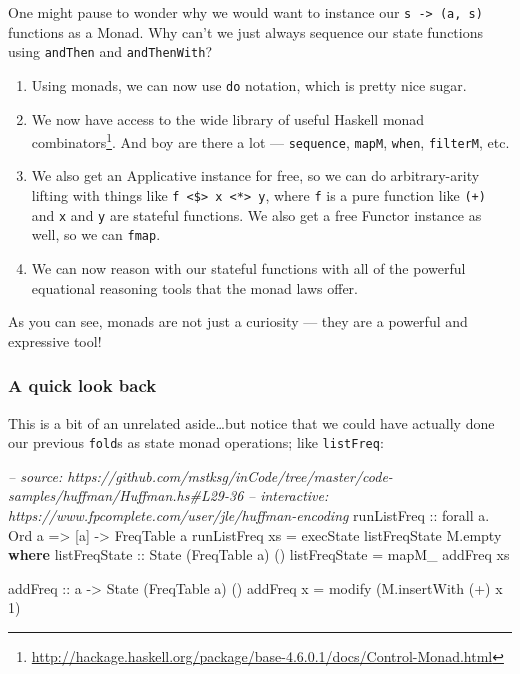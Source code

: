 \documentclass[]{article}
\newenvironment{Shaded}{}{}
\newcommand{\KeywordTok}[1]{\textcolor[rgb]{0.00,0.44,0.13}{\textbf{{#1}}}}
\newcommand{\DataTypeTok}[1]{\textcolor[rgb]{0.56,0.13,0.00}{{#1}}}
\newcommand{\DecValTok}[1]{\textcolor[rgb]{0.25,0.63,0.44}{{#1}}}
\newcommand{\CommentTok}[1]{\textcolor[rgb]{0.38,0.63,0.69}{\textit{{#1}}}}
\newcommand{\OtherTok}[1]{\textcolor[rgb]{0.00,0.44,0.13}{{#1}}}
\newcommand{\FunctionTok}[1]{\textcolor[rgb]{0.02,0.16,0.49}{{#1}}}
\newcommand{\NormalTok}[1]{{#1}}
\renewcommand{\href}[2]{#2\footnote{\url{#1}}}
\begin{document}
One might pause to wonder why we would want to instance our
\texttt{s\ -\textgreater{}\ (a,\ s)} functions as a Monad. Why can't we
just always sequence our state functions using \texttt{andThen} and
\texttt{andThenWith}?

\begin{enumerate}
\def\labelenumi{\arabic{enumi}.}
\item
  Using monads, we can now use \texttt{do} notation, which is pretty
  nice sugar.
\item
  We now have access to the wide library of useful Haskell
  \href{http://hackage.haskell.org/package/base-4.6.0.1/docs/Control-Monad.html}{monad
  combinators}. And boy are there a lot --- \texttt{sequence},
  \texttt{mapM}, \texttt{when}, \texttt{filterM}, etc.
\item
  We also get an Applicative instance for free, so we can do
  arbitrary-arity lifting with things like
  \texttt{f\ \textless{}\$\textgreater{}\ x\ \textless{}*\textgreater{}\ y},
  where \texttt{f} is a pure function like \texttt{(+)} and \texttt{x}
  and \texttt{y} are stateful functions. We also get a free Functor
  instance as well, so we can \texttt{fmap}.
\item
  We can now reason with our stateful functions with all of the powerful
  equational reasoning tools that the monad laws offer.
\end{enumerate}

As you can see, monads are not just a curiosity --- they are a powerful
and expressive tool!

\subsubsection{A quick look back}\label{a-quick-look-back}

This is a bit of an unrelated aside\ldots{}but notice that we could have
actually done our previous \texttt{fold}s as state monad operations;
like \texttt{listFreq}:

\begin{Shaded}
\begin{Highlighting}[]
\CommentTok{-- source: https://github.com/mstksg/inCode/tree/master/code-samples/huffman/Huffman.hs#L29-36}
\CommentTok{-- interactive: https://www.fpcomplete.com/user/jle/huffman-encoding}
\OtherTok{runListFreq ::} \NormalTok{forall a}\FunctionTok{.} \DataTypeTok{Ord} \NormalTok{a }\OtherTok{=>} \NormalTok{[a] }\OtherTok{->} \DataTypeTok{FreqTable} \NormalTok{a}
\NormalTok{runListFreq xs }\FunctionTok{=} \NormalTok{execState listFreqState M.empty}
  \KeywordTok{where}
\OtherTok{    listFreqState ::} \DataTypeTok{State} \NormalTok{(}\DataTypeTok{FreqTable} \NormalTok{a) ()}
    \NormalTok{listFreqState }\FunctionTok{=} \NormalTok{mapM_ addFreq xs}

\OtherTok{    addFreq ::} \NormalTok{a }\OtherTok{->} \DataTypeTok{State} \NormalTok{(}\DataTypeTok{FreqTable} \NormalTok{a) ()}
    \NormalTok{addFreq x }\FunctionTok{=} \NormalTok{modify (M.insertWith (}\FunctionTok{+}\NormalTok{) x }\DecValTok{1}\NormalTok{)}
\end{Highlighting}
\end{Shaded}
\end{document}
